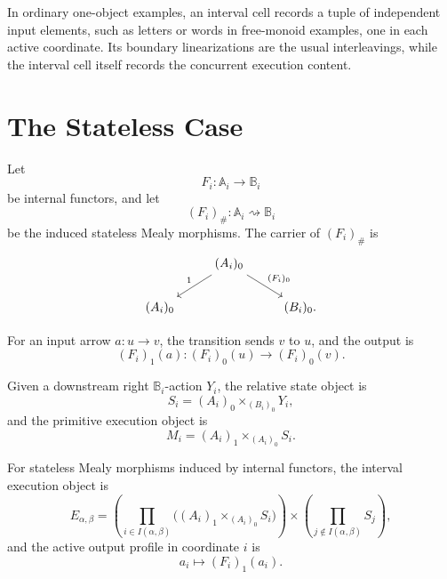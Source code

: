 \begin{remark}
\label{rem:cmett-one-object-automata-reading}
    In ordinary one-object examples, an interval cell records a tuple of
    independent input elements, such as letters or words in free-monoid
    examples, one in each active coordinate. Its boundary linearizations are
    the usual interleavings, while the interval cell itself records the
    concurrent execution content.
\end{remark}

\section{The Stateless Case}
\label{sec:cmett-stateless-case}

Let
\[
    F_i:\mathbb A_i\to\mathbb B_i
\]
be internal functors, and let
\[
    (F_i)_\#:\mathbb A_i\rightsquigarrow\mathbb B_i
\]
be the induced stateless Mealy morphisms. The carrier of \((F_i)_\#\) is
\[
\begin{tikzcd}
&
(A_i)_0
    \arrow[dl,"1"']
    \arrow[dr,"(F_i)_0"]
&
\\
(A_i)_0
&&
(B_i)_0 .
\end{tikzcd}
\]

For an input arrow \(a:u\to v\), the transition sends \(v\) to \(u\), and the
output is
\[
    (F_i)_1(a):(F_i)_0(u)\to(F_i)_0(v).
\]

Given a downstream right \(\mathbb B_i\)-action \(Y_i\), the relative state
object is
\[
    S_i
    =
    (A_i)_0\times_{(B_i)_0}Y_i,
\]
and the primitive execution object is
\[
    M_i
    =
    (A_i)_1\times_{(A_i)_0}S_i.
\]

\begin{proposition}
\label{prop:cmett-stateless-interval-execution}
    For stateless Mealy morphisms induced by internal functors, the interval
    execution object is
    \[
        E_{\alpha,\beta}
        =
        \left(\prod_{i\in I(\alpha,\beta)}
        \bigl((A_i)_1\times_{(A_i)_0}S_i\bigr)\right)
        \times
        \left(\prod_{j\notin I(\alpha,\beta)}S_j\right),
    \]
    and the active output profile in coordinate \(i\) is
    \[
        a_i\longmapsto (F_i)_1(a_i).
    \]
\end{proposition}

